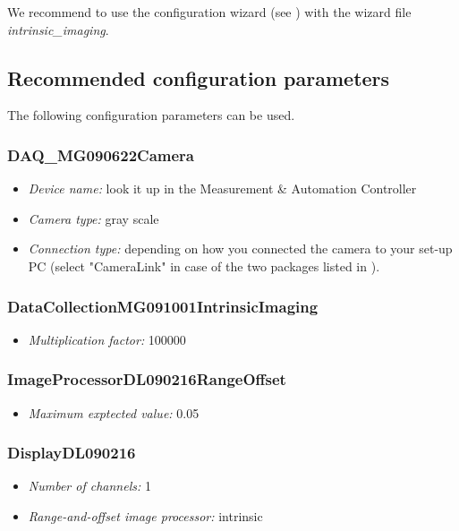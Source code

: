 We recommend to use the configuration wizard (see ) with the wizard file \textit{intrinsic_imaging}. 

\subsection{Recommended configuration parameters}
The following configuration parameters can be used.

\subsubsection{DAQ_MG090622Camera}
\begin{itemize}[noitemsep]
	\item \textit{Device name:} look it up in the Measurement \& Automation Controller
 	\item \textit{Camera type:} gray scale
	\item \textit{Connection type:} depending on how you connected the camera to your set-up PC (select "CameraLink" in case of the two packages listed in ).
\end{itemize}

\subsubsection{DataCollectionMG091001IntrinsicImaging}
\begin{itemize}[noitemsep]
	\item \textit{Multiplication factor:} 100000
\end{itemize}

\subsubsection{ImageProcessorDL090216RangeOffset}
\begin{itemize}[noitemsep]
	\item \textit{Maximum exptected value:} 0.05
\end{itemize}

\subsubsection{DisplayDL090216}
\begin{itemize}[noitemsep]
	\item \textit{Number of channels:} 1
	\item \textit{Range-and-offset image processor:} intrinsic
\end{itemize}

